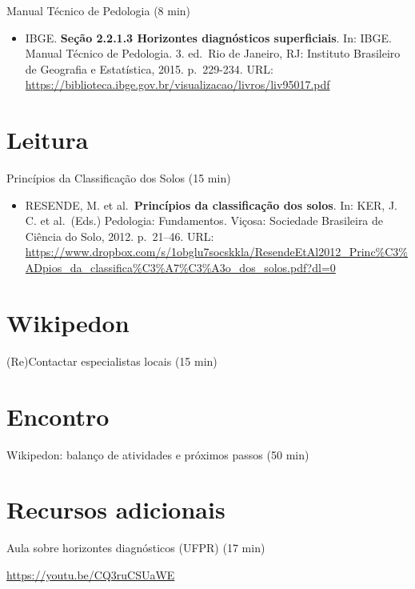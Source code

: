 \documentclass[
  11pt,
  a4paper,
  dvipsnames]{tufte-book}
\providecommand{\tightlist}{%
  \setlength{\itemsep}{0pt}\setlength{\parskip}{0pt}}
\begin{document}
Manual Técnico de Pedologia (8 min)

\begin{itemize}
\tightlist
\item
  IBGE. \textbf{Seção 2.2.1.3 Horizontes diagnósticos superficiais}. In: IBGE. Manual Técnico de Pedologia. 3. ed.~Rio de Janeiro, RJ: Instituto Brasileiro de Geografia e Estatística, 2015. p.~229-234. URL: \url{https://biblioteca.ibge.gov.br/visualizacao/livros/liv95017.pdf}
\end{itemize}

\hypertarget{leitura-5}{%
\section{Leitura}\label{leitura-5}}

Princípios da Classificação dos Solos (15 min)

\begin{itemize}
\tightlist
\item
  RESENDE, M. et al.~\textbf{Princípios da classificação dos solos}. In: KER, J. C. et al.~(Eds.) Pedologia: Fundamentos. Viçosa: Sociedade Brasileira de Ciência do Solo, 2012. p.~21--46. URL: \url{https://www.dropbox.com/s/1obglu7socskkla/ResendeEtAl2012_Princ\%C3\%ADpios_da_classifica\%C3\%A7\%C3\%A3o_dos_solos.pdf?dl=0}
\end{itemize}

\hypertarget{wikipedon-4}{%
\section{Wikipedon}\label{wikipedon-4}}

(Re)Contactar especialistas locais (15 min)

\hypertarget{encontro-2}{%
\section{Encontro}\label{encontro-2}}

Wikipedon: balanço de atividades e próximos passos (50 min)

\hypertarget{recursos-adicionais-2}{%
\section{Recursos adicionais}\label{recursos-adicionais-2}}

Aula sobre horizontes diagnósticos (UFPR) (17 min)

\url{https://youtu.be/CQ3ruCSUaWE}
\end{document}
